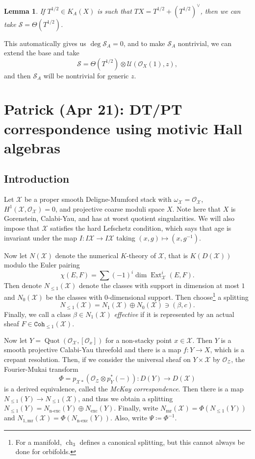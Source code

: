 \documentclass[leqno, openany]{memoir}
\newtheorem{lem}[thm]{Lemma}
\theoremstyle{definition}
\theoremstyle{remark}
\theoremstyle{plain}
\theoremstyle{definition}
\theoremstyle{remark}
\newcommand{\mc}[1]{\mathcal{#1}}
\newcommand{\mr}[1]{\mathrm{#1}}
\newcommand{\mt}[1]{\mathtt{#1}}
\newcommand{\on}[1]{\operatorname{#1}}
\DeclareMathOperator{\Ext}{Ext}
\begin{document}
\begin{lem}
    If $T^{1/2} \in K_A(X)$ is such that $TX = T^{1/2} + (T^{1/2})^{\vee}$, then we can take $\mc{S} = \Theta(T^{1/2})$.
\end{lem}

This automatically gives us $\deg \mc{S}_A = 0$, and to make $\mc{S}_A$ nontrivial, we can extend the base and take
\[ \mc{S} = \Theta(T^{1/2}) \otimes \mc{U}(\mc{O}_X(1), z), \]
and then $\mc{S}_A$ will be nontrivial for generic $z$.

\chapter{Patrick (Apr 21): DT/PT correspondence using motivic Hall algebras}%

\section{Introduction}

Let $\mc{X}$ be a proper smooth Deligne-Mumford stack with $\omega_{\mc{X}} = \mc{O}_{\mc{X}}$, $H^1(\mc{X}, \mc{O}_{\mc{X}}) = 0$, and projective coarse moduli space $X$. Note here that $X$ is Gorenstein, Calabi-Yau, and has at worst quotient singularities. We will also impose that $\mc{X}$ satisfies the hard Lefschetz condition, which says that age is invariant under the map $I \colon I \mc{X} \to I \mc{X}$ taking $(x, g) \mapsto (x, g^{-1})$.

Now let $N(\mc{X})$ denote the numerical $K$-theory of $\mc{X}$, that is $K(D(\mc{X}))$ modulo the Euler pairing
\[ \chi(E, F) = \sum (-1)^i \dim \Ext^i_{\mc{X}}(E, F). \]
Then denote $N_{\leq 1}(\mc{X})$ denote the classes with support in dimension at most $1$ and $N_0(\mc{X})$ be the classes with $0$-dimensional support. Then choose\footnote{For a manifold, $\on{ch}_3$ defines a canonical splitting, but this cannot always be done for orbifolds.} a splitting
\[ N_{\leq 1}(\mc{X}) = N_1(\mc{X}) \oplus N_0(\mc{X}) \ni (\beta, c). \]
Finally, we call a class $\beta \in N_1(\mc{X})$ \textit{effective} if it is represented by an actual sheaf $F \in \mt{Coh}_{\leq 1}(\mc{X})$.

Now let $Y = \on{Quot}(\mc{O}_{\mc{X}}, [\mc{O}_x])$ for a non-stacky point $x \in \mc{X}$. Then $Y$ is a smooth projective Calabi-Yau threefold and there is a map $f \colon Y \to X$, which is a crepant resolution. Then, if we consider the universal sheaf on $Y \times \mc{X}$ by $\mc{O}_{\mc{Z}}$, the Fourier-Mukai transform
\[ \Phi = p_{\mc{X}*} (\mc{O}_{\mc{Z}} \otimes p_Y^*(-)) \colon D(Y) \to D(\mc{X}) \]
is a derived equivalence, called the \textit{McKay correspondence}. Then there is a map $N_{\leq 1}(Y) \to N_{\leq 1}(\mc{X})$, and thus we obtain a splitting $N_{\leq 1}(Y) = N_{\text{n-exc}}(Y) \oplus N_{\mr{exc}}(Y)$. Finally, write $N_{\mr{mr}}(\mc{X}) = \Phi(N_{\leq 1}(Y))$ and $N_{1,\mr{mr}}(\mc{X}) = \Phi(N_{\text{n-exc}}(Y))$. Also, write $\Psi \coloneqq \Phi^{-1}$.
\end{document}
